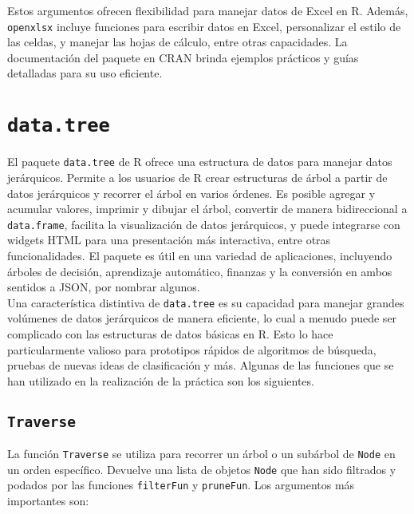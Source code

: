 \documentclass[12pt]{report}\usepackage[]{graphicx}\usepackage[dvipsnames]{xcolor}
\begin{document}
		 	Estos argumentos ofrecen flexibilidad para manejar datos de Excel en R. Además, \texttt{openxlsx} incluye funciones para escribir datos en Excel, personalizar el estilo de las celdas, y manejar las hojas de cálculo, entre otras capacidades. La documentación del paquete en CRAN brinda ejemplos prácticos y guías detalladas para su uso eficiente.
 	
 		\section{\texttt{data.tree}}
 	
		 	El paquete \texttt{data.tree} de R ofrece una estructura de datos para manejar datos jerárquicos. Permite a los usuarios de R crear estructuras de árbol a partir de datos jerárquicos y recorrer el árbol en varios órdenes. Es posible agregar y acumular valores, imprimir y dibujar el árbol, convertir de manera bidireccional a  \texttt{data.frame}, facilita la visualización de datos jerárquicos, y puede integrarse con widgets HTML para una presentación más interactiva, entre otras funcionalidades. El paquete es útil en una variedad de aplicaciones, incluyendo árboles de decisión, aprendizaje automático, finanzas y la conversión en ambos sentidos a JSON, por nombrar algunos.\\
		 	
		 	Una característica distintiva de \texttt{data.tree} es su capacidad para manejar grandes volúmenes de datos jerárquicos de manera eficiente, lo cual a menudo puede ser complicado con las estructuras de datos básicas en R. Esto lo hace particularmente valioso para prototipos rápidos de algoritmos de búsqueda, pruebas de nuevas ideas de clasificación y más. Algunas de las funciones que se han utilizado en la realización de la práctica son los siguientes.
 	
 			\subsection{\texttt{Traverse}}
 	
			 	La función \texttt{Traverse} se utiliza para recorrer un árbol o un subárbol de \texttt{Node} en un orden específico. Devuelve una lista de objetos \texttt{Node} que han sido filtrados y podados por las funciones \texttt{filterFun} y \texttt{pruneFun}. Los argumentos más importantes son:
			 	
\end{document}
